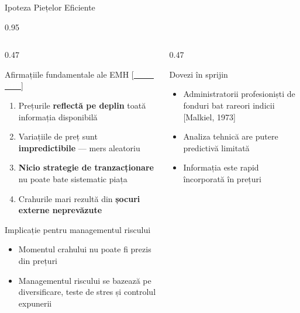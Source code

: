 \documentclass[9pt, aspectratio=169, t]{beamer}
\begin{document}
\begin{frame}{Ipoteza Piețelor Eficiente}
    \begin{cminipage}{0.95\textwidth}
    {\scriptsize
    \begin{columns}[T]
        \begin{column}{0.47\textwidth}
            \begin{block}{Afirmațiile fundamentale ale EMH {\scriptsize[\href{https://doi.org/10.2307/2325486}{\textcolor{white}{Fama, 1970}}]}}
                \begin{enumerate}\setlength{\itemsep}{0pt}
                    \item Prețurile \textbf{reflectă pe deplin} toată informația disponibilă
                    \item Variațiile de preț sunt \textbf{impredictibile} --- mers aleatoriu
                    \item \textbf{Nicio strategie de tranzacționare} nu poate bate sistematic piața
                    \item Crahurile mari rezultă din \textbf{șocuri externe neprevăzute}
                \end{enumerate}
            \end{block}
            \vspace{-2mm}
            \begin{alertblock}{Implicație pentru managementul riscului}
                \begin{itemize}\setlength{\itemsep}{0pt}
                    \item Momentul crahului nu poate fi prezis din prețuri
                    \item Managementul riscului se bazează pe diversificare, teste de stres și controlul expunerii
                \end{itemize}
            \end{alertblock}
        \end{column}
        \begin{column}{0.47\textwidth}
            \begin{exampleblock}{Dovezi în sprijin}
                \begin{itemize}\setlength{\itemsep}{0pt}
                    \item Administratorii profesioniști de fonduri bat rareori indicii [Malkiel, 1973]
                    \item Analiza tehnică are putere predictivă limitată
                    \item Informația este rapid încorporată în prețuri

\end{itemize}
\end{exampleblock}
\end{column}
\end{columns}}
\end{cminipage}
\end{frame}
\end{document}
